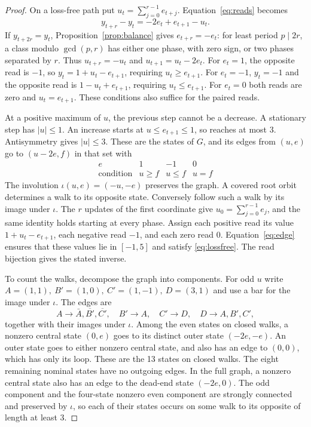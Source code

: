 \documentclass[11pt]{amsart}
\theoremstyle{definition}
\begin{document}
\begin{proof}
On a loss-free path put \(u_t=\sum_{j=0}^{r-1}e_{t+j}\).
Equation~\eqref{eq:reads} becomes
\begin{equation}\label{eq:lossfree}
 y_{t+r}-y_t=-2e_t+e_{t+1}-u_t .
\end{equation}
If \(y_{t+2r}=y_t\), Proposition~\ref{prop:balance} gives
\(e_{t+r}=-e_t\): for least period \(p\mid2r\), a class
modulo \(\gcd(p,r)\) has either one phase, with zero sign, or
two phases separated by \(r\).
Thus \(u_{t+r}=-u_t\) and \(u_{t+1}=u_t-2e_t\).
For \(e_t=1\), the opposite read is \(-1\), so
\(y_t=1+u_t-e_{t+1}\), requiring \(u_t\ge e_{t+1}\).
For \(e_t=-1\), \(y_t=-1\) and the opposite read is
\(1-u_t+e_{t+1}\), requiring \(u_t\le e_{t+1}\).
For \(e_t=0\) both reads are zero and \(u_t=e_{t+1}\).
These conditions also suffice for the paired reads.

At a positive maximum of \(u\), the previous step cannot
be a decrease. A stationary step has \(|u|\le1\).
An increase starts at \(u\le e_{t+1}\le1\), so reaches
at most 3. Antisymmetry gives \(|u|\le3\).
These are the states of \(G\), and its edges from \((u,e)\) go to
\((u-2e,f)\) in that set with
\begin{equation}\label{eq:edge}
 \begin{array}{c|ccc}
 e&1&-1&0\\ \hline
 \text{condition}&u\ge f&u\le f&u=f
 \end{array}
\end{equation}
The involution \(\iota(u,e)=(-u,-e)\) preserves the graph.
A covered root orbit determines a walk to its opposite state.
Conversely follow such a walk by its image under \(\iota\).
The \(r\) updates of the first coordinate give
\(u_0=\sum_{j=0}^{r-1}e_j\), and the same identity holds
starting at every phase. Assign each positive read its
value \(1+u_t-e_{t+1}\), each negative read \(-1\), and
each zero read 0. Equation~\eqref{eq:edge} ensures that
these values lie in \([-1,5]\) and satisfy
\eqref{eq:lossfree}. The read bijection gives the stated
inverse.

To count the walks, decompose the graph into components.
For odd \(u\) write
\(A=(1,1),\ B'=(1,0),\ C'=(1,-1),\ D=(3,1)\)
and use a bar for the image under \(\iota\).
The edges are
\[
 A\to\bar A,\overline{B'},\overline{C'},\quad
 B'\to A,\quad C'\to D,\quad D\to A,B',C',
\]
together with their images under \(\iota\).
Among the even states on closed walks, a nonzero central
state \((0,e)\) goes to its distinct outer state \((-2e,-e)\). An outer
state goes to either nonzero central state, and also has an edge to
\((0,0)\), which has only its loop. These are the 13 states on closed
walks. The eight remaining nominal states have no outgoing edges. In
the full graph, a nonzero central state also has an edge to the
dead-end state \((-2e,0)\). The odd component and the four-state
nonzero even component are strongly connected and
preserved by \(\iota\), so each of their states occurs
on some walk to its opposite of length at least 3.


\end{proof}
\end{document}
